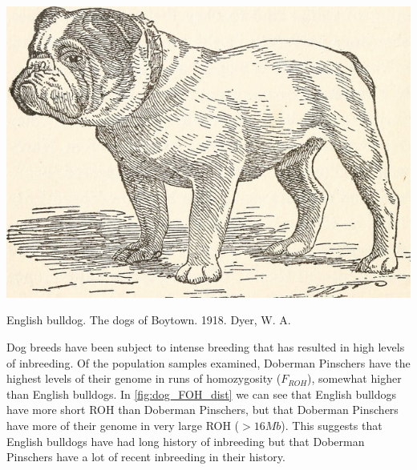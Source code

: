 {{  \begin{marginfigure}[-1cm]
  \begin{center}
    \includegraphics[width=
    \textwidth]{illustration_images/alleles_genotypes/english_bulldog/14752595581_4330377c97_z.jpg}
\end{center}
\caption{English bulldog. The dogs of Boytown. 1918.  Dyer, W. A.} \label{fig:bulldog}
\end{marginfigure}

Dog breeds have been subject
to intense breeding that has resulted in high levels of inbreeding. Of the population samples examined, Doberman Pinschers have the highest levels of their genome in runs of
homozygosity ($F_{ROH}$), somewhat higher than English bulldogs. In \ref{fig:dog_FOH_dist} we can see that English bulldogs have more short ROH than Doberman Pinschers, but that Doberman Pinschers have more of their genome in very large ROH ($>16 Mb$). This suggests that English bulldogs have had long history of inbreeding but that Doberman Pinschers have a lot of recent inbreeding in their history.

}}
